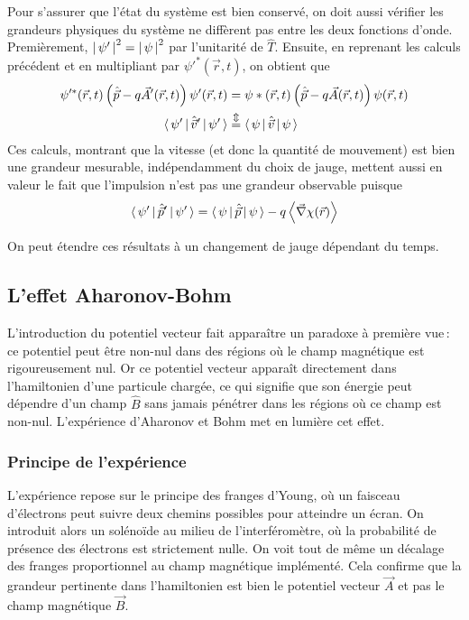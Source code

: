        Pour s’assurer que l’état du système est bien conservé, on doit aussi vérifier les grandeurs physiques du système ne diffèrent pas entre les deux fonctions d’onde. Premièrement, $\left\lvert \, \psi' \, \right\rvert^2 = \left\lvert \, \psi \, \right\rvert^2$ par l’unitarité de $\hat{T}$. Ensuite, en reprenant les calculs précédent et en multipliant par $\psi'^*(\vec{r},t)$, on obtient que 
        \begin{align*}
            \psi'^*(\vec{r},t) \left(\hat{\vec{p}}- q \vec{A}'(\vec{r},t)\right) \psi'(\vec{r},t) &= \psi*(\vec{r},t) \left(\hat{\vec{p}}- q \vec{A}(\vec{r},t)\right)\psi(\vec{r},t) \\
            \left< \, \psi' \, \right| \hat{\vec{v}}' \left| \, \psi' \, \right> &\overset{\Updownarrow}{=} \left< \, \psi \, \right| \hat{\vec{v}} \left| \, \psi \, \right> \\
        \end{align*}
        Ces calculs, montrant que la vitesse (et donc la quantité de mouvement) est bien une grandeur mesurable, indépendamment du choix de jauge, mettent aussi en valeur le fait que l’impulsion n’est pas une grandeur observable puisque
        \[ \left< \, \psi' \, \right| \hat{\vec{p}}' \left| \, \psi' \, \right> = \left< \, \psi \, \right| \hat{\vec{p}} \left| \, \psi \, \right> - q \left<\vec{\nabla} \chi(\vec{r})\right> \]

        On peut étendre ces résultats à un changement de jauge dépendant du temps.

    \subsection{L’effet Aharonov-Bohm}

        L’introduction du potentiel vecteur fait apparaître un paradoxe à première vue : ce potentiel peut être non-nul dans des régions où le champ magnétique est rigoureusement nul. Or ce potentiel vecteur apparaît directement dans l’hamiltonien d’une particule chargée, ce qui signifie que son énergie peut dépendre d’un champ $\hat{B}$ sans jamais pénétrer dans les régions où ce champ est non-nul. L’expérience d’Aharonov et Bohm met en lumière cet effet.
        
        \subsubsection{Principe de l’expérience}

        L’expérience repose sur le principe des franges d’Young, où un faisceau d’électrons peut suivre deux chemins possibles pour atteindre un écran. On introduit alors un solénoïde au milieu de l’interféromètre, où la probabilité de présence des électrons est strictement nulle. On voit tout de même un décalage des franges proportionnel au champ magnétique implémenté. Cela confirme que la grandeur pertinente dans l’hamiltonien est bien le potentiel vecteur $\vec{A}$ et pas le champ magnétique $\vec{B}$.


